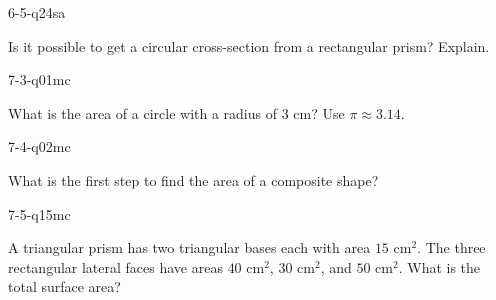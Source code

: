 \begin{practiceQuestion}{6-5-q24}{sa}
\begin{questionText}
Is it possible to get a circular cross-section from a rectangular prism? Explain.
\end{questionText}
\end{practiceQuestion}

\begin{practiceQuestion}{7-3-q01}{mc}
\begin{questionText}
What is the area of a circle with a radius of $3$ cm? Use $\pi \approx 3.14$.
\end{questionText}
\end{practiceQuestion}

\begin{practiceQuestion}{7-4-q02}{mc}
\begin{questionText}
What is the first step to find the area of a composite shape?
\end{questionText}
\end{practiceQuestion}

\begin{practiceQuestion}{7-5-q15}{mc}
\begin{questionText}
A triangular prism has two triangular bases each with area $15$ cm$^2$. The three rectangular lateral faces have areas $40$ cm$^2$, $30$ cm$^2$, and $50$ cm$^2$. What is the total surface area?
\end{questionText}
\end{practiceQuestion}

